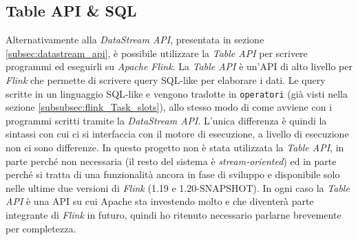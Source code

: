 \subsection{Table API \& SQL}
\label{subsec:flink_table_api}
Alternativamente alla \textit{DataStream API}, presentata in sezione \ref{subsec:datastream_api}, è possibile utilizzare la \textit{Table API}
 per scrivere programmi ed eseguirli su \textit{Apache Flink}.
La \textit{Table API} è un'API di alto livello per \textit{Flink} che permette di scrivere query SQL-like per elaborare i dati.
Le query scritte in un linguaggio SQL-like e vengono tradotte in \texttt{operatori} (già visti nella sezione \ref{subsubsec:flink_Task_slots}), 
allo stesso modo di come avviene con i programmi scritti tramite la \textit{DataStream API}.
L'unica differenza è quindi la sintassi con cui ci si interfaccia con il motore di esecuzione, a livello di esecuzione non ci sono differenze.
In questo progetto non è stata utilizzata la \textit{Table API}, in parte perché non necessaria (il resto del sistema è \textit{stream-oriented}) ed in parte
perché si tratta di una funzionalità ancora in fase di sviluppo e disponibile solo nelle ultime due versioni di \textit{Flink} (1.19 e 1.20-SNAPSHOT).
In ogni caso la \textit{Table API} è una API su cui Apache sta investendo molto e che diventerà parte integrante di \textit{Flink} in futuro, quindi 
ho ritenuto necessario parlarne brevemente per completezza.

